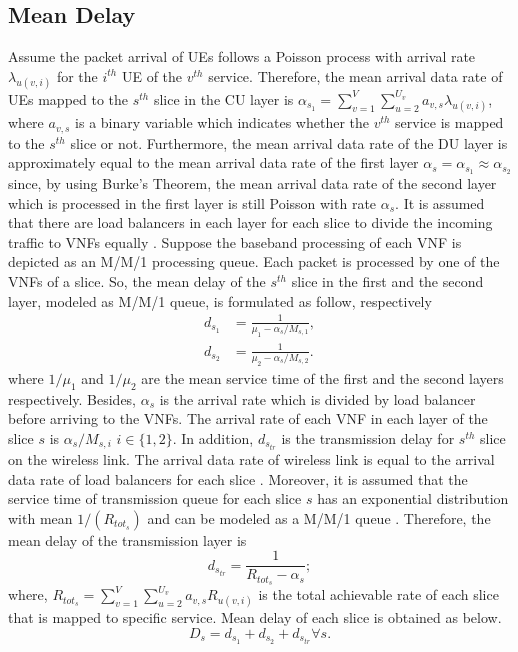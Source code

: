 \documentclass[conference]{IEEEtran}
\begin{document}
\subsection{Mean Delay}
Assume the packet arrival of UEs follows a Poisson process with arrival rate $\lambda_{u(v,i)}$ for the $i^{th}$ UE of the $v^{th}$ service.
Therefore, the mean arrival data rate of UEs mapped to the $s^{th}$ slice in the CU layer is $\alpha_{s_1} = \sum_{v=1}^{V}\sum_{u=2}^{U_v}a_{v,s}\lambda_{u(v,i)}$, where $a_{v,s}$ is a binary variable which indicates whether the $v^{th}$ service is mapped to the $s^{th}$ slice or not.
Furthermore, the mean arrival data rate of the DU layer is approximately equal to the mean arrival data rate of the first layer $\alpha_{s} =\alpha_{s_1} \approx \alpha_{s_2}$ since, by using Burke’s Theorem, the mean arrival data rate of the second layer which is processed in the first layer is still Poisson with rate $\alpha_{s}$.
It is assumed that there are load balancers in each layer for each slice to divide the incoming traffic to VNFs equally \cite{frdl,luong2018novel,luong2018novel1}.
Suppose the baseband processing of each VNF is depicted as an M/M/1 processing queue.
Each packet is processed by one of the VNFs of a slice. So, the mean delay of the $s^{th}$ slice in the first and the second layer, modeled as M/M/1 queue, is formulated as follow, respectively
\begin{equation}
\begin{split}
d_{s_1} &= \frac{1}{\mu_1 - \alpha_{s}/{M_{s,1}}},\\
d_{s_2} &= \frac{1}{\mu_2 - \alpha_{s}/{M_{s,2}}}.
\end{split}
\end{equation}
where $1/\mu_1$ and $1/\mu_2$ are the mean service time of the first and the second layers respectively.
Besides, $\alpha_{s}$ is the  arrival rate which is divided
by load balancer before arriving to the VNFs. The  arrival rate of each VNF in each layer of the slice $s$ is $\alpha_{s}/{M_{s,i}}$ $ i \in \{1,2\}$.
In addition, $d_{s_{tr}}$ is the transmission delay for $s^{th}$ slice on the  wireless link. The arrival data rate of wireless link
 is equal to the arrival data rate of load balancers for each slice \cite{frdl}.
Moreover, it is assumed that the service time of transmission queue for each slice $s$ has
 an exponential distribution with mean $1/(R_{{tot}_s})$ and can be modeled as a M/M/1 queue \cite{frdl,luong2018novel,luong2018novel1,guo2016exploiting}. Therefore,
the mean delay of the transmission layer is
\begin{equation}
 d_{s_{tr}} = \frac{1}{R_{{tot}_s} - \alpha_{s}};
\end{equation}
where, $R_{{tot}_s} =  \sum_{v=1}^{V}\sum_{u=2}^{U_v}a_{v,s}R_{u(v,i)}$ is the total achievable rate of each slice that is mapped to specific service.
Mean delay of each slice is obtained as below.
\begin{equation}
D_{s} = d_{s_1} + d_{s_2} + d_{s_{tr}} \forall s.
\end{equation}
\end{document}
